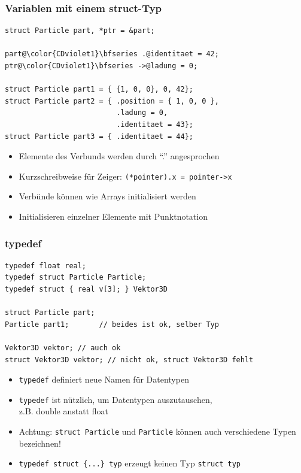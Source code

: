\documentclass{slides}
\begin{document}
\begin{frame}[fragile]
  \frametitle{Variablen mit einem struct-Typ}
  
\begin{lstlisting}[emph=struct]
struct Particle part, *ptr = &part;

part@\color{CDviolet1}\bfseries .@identitaet = 42;
ptr@\color{CDviolet1}\bfseries ->@ladung = 0;

struct Particle part1 = { {1, 0, 0}, 0, 42};
struct Particle part2 = { .position = { 1, 0, 0 },
                          .ladung = 0,
                          .identitaet = 43};
struct Particle part3 = { .identitaet = 44};
\end{lstlisting}
  \vfill

  \begin{itemize}
  \item Elemente des Verbunds werden durch "`."' angesprochen
  \item Kurzschreibweise für Zeiger: \lstinline!(*pointer).x = pointer->x!
  \item Verbünde können wie Arrays initialisiert werden
  \item Initialisieren einzelner Elemente mit Punktnotation
  \end{itemize}
\end{frame}

\begin{frame}[fragile]
  \frametitle{typedef}
\begin{lstlisting}[emph=typedef]
typedef float real;
typedef struct Particle Particle;
typedef struct { real v[3]; } Vektor3D

struct Particle part;
Particle part1;       // beides ist ok, selber Typ

Vektor3D vektor; // auch ok
struct Vektor3D vektor; // nicht ok, struct Vektor3D fehlt
\end{lstlisting}

  \begin{itemize}
  \item \lstinline!typedef! definiert neue Namen für Datentypen
  \item \lstinline!typedef! ist nützlich, um Datentypen auszutauschen,\\
    z.B. double anstatt float
  \item Achtung: \lstinline!struct Particle! und \lstinline!Particle!
    können auch verschiedene Typen bezeichnen!
  \item \lstinline!typedef struct {...} typ! erzeugt keinen Typ \lstinline!struct typ!
  \end{itemize}
\end{frame}
\end{document}
